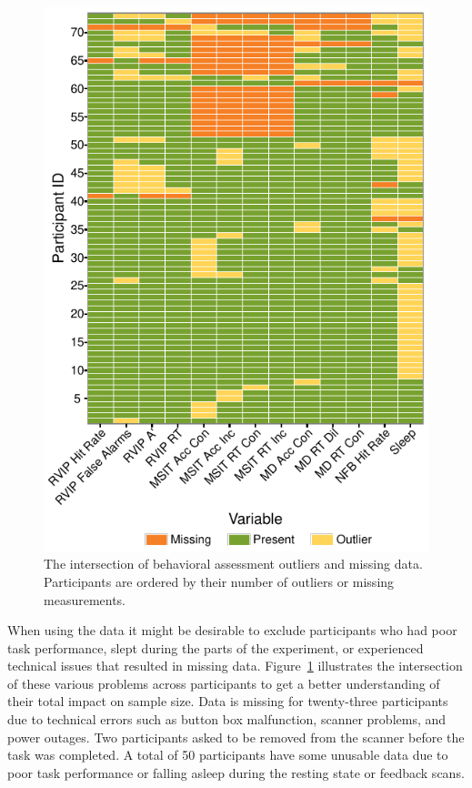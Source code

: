 \begin{figure}[h!]
   \centering
   \includegraphics[width=.75\textwidth]{outliers.pdf}
   \caption{The intersection of behavioral assessment outliers and missing data.  Participants are ordered by their number of outliers or missing measurements.}
   \label{fig:outliers}
\end{figure}

When using the data it might be desirable to exclude participants who had poor task performance, slept during the parts of the experiment, or experienced technical issues that resulted in missing data. Figure~\ref{fig:outliers} illustrates the intersection of these various problems across participants to get a better understanding of their total impact on sample size. Data is missing for twenty-three participants due to technical errors such as button box malfunction, scanner problems, and power outages. Two participants asked to be removed from the scanner before the task was completed. A total of 50 participants have some unusable data due to poor task performance or falling asleep during the resting state or feedback scans.

